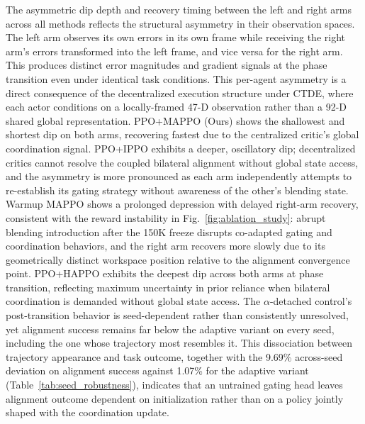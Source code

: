 \documentclass[a4paper,fleqn]{cas-dc}
\begin{document}
The asymmetric dip depth and recovery timing between the left and right arms across all methods reflects the structural asymmetry in their observation spaces. The left arm observes its own errors in its own frame while receiving the right arm's errors transformed into the left frame, and vice versa for the right arm. This produces distinct error magnitudes and gradient signals at the phase transition even under identical task conditions. This per-agent asymmetry is a direct consequence of the decentralized execution structure under CTDE, where each actor conditions on a locally-framed 47-D observation rather than a 92-D shared global representation. PPO+MAPPO (Ours) shows the shallowest and shortest dip on both arms, recovering fastest due to the centralized critic's global coordination signal. PPO+IPPO exhibits a deeper, oscillatory dip; decentralized critics cannot resolve the coupled bilateral alignment without global state access, and the asymmetry is more pronounced as each arm independently attempts to re-establish its gating strategy without awareness of the other's blending state. Warmup MAPPO shows a prolonged depression with delayed right-arm recovery, consistent with the reward instability in Fig.~\ref{fig:ablation_study}: abrupt blending introduction after the 150K freeze disrupts co-adapted gating and coordination behaviors, and the right arm recovers more slowly due to its geometrically distinct workspace position relative to the alignment convergence point. PPO+HAPPO exhibits the deepest dip across both arms at phase transition, reflecting maximum uncertainty in prior reliance when bilateral coordination is demanded without global state access. The $\alpha$-detached control's post-transition behavior is seed-dependent rather than consistently unresolved, yet alignment success remains far below the adaptive variant on every seed, including the one whose trajectory most resembles it. This dissociation between trajectory appearance and task outcome, together with the 9.69\% across-seed deviation on alignment success against 1.07\% for the adaptive variant (Table~\ref{tab:seed_robustness}), indicates that an untrained gating head leaves alignment outcome dependent on initialization rather than on a policy jointly shaped with the coordination update.
\end{document}
